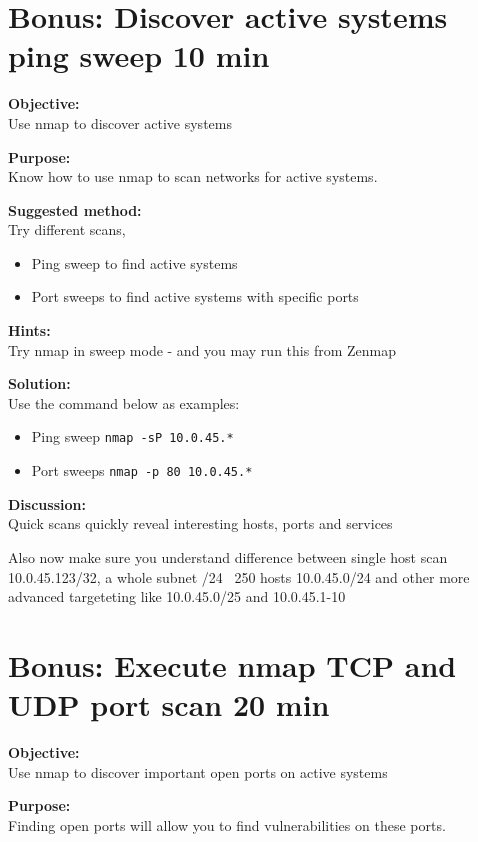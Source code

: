 \documentclass[a4paper,11pt,notitlepage]{report}
\begin{document}
\chapter{Bonus: Discover active systems ping sweep 10 min}
\label{ex:nmap-pingsweep}

{\bf Objective:}\\
Use nmap to discover active systems

{\bf Purpose:}\\
Know how to use nmap to scan networks for active systems.

{\bf Suggested method:}\\
Try different scans,
\begin{itemize}
\item Ping sweep to find active systems
\item Port sweeps to find active systems with specific ports
\end{itemize}

{\bf Hints:} \\
Try nmap in sweep mode - and you may run this from Zenmap

{\bf Solution:}\\
Use the command below as examples:
\begin{itemize}
\item Ping sweep \verb+nmap -sP 10.0.45.*+
\item Port sweeps \verb+nmap -p 80 10.0.45.*+
\end{itemize}

{\bf Discussion:}\\
Quick scans quickly reveal interesting hosts, ports and services

Also now make sure you understand difference between single host scan
10.0.45.123/32, a whole subnet /24 ~250 hosts 10.0.45.0/24 and other more advanced targeteting like 10.0.45.0/25 and 10.0.45.1-10


\chapter{Bonus: Execute nmap TCP and UDP port scan 20 min}
\label{ex:nmap-synscan}


{\bf Objective:} \\
Use nmap to discover important open ports on active systems

{\bf Purpose:}\\
Finding open ports will allow you to find vulnerabilities on these ports.
\end{document}
